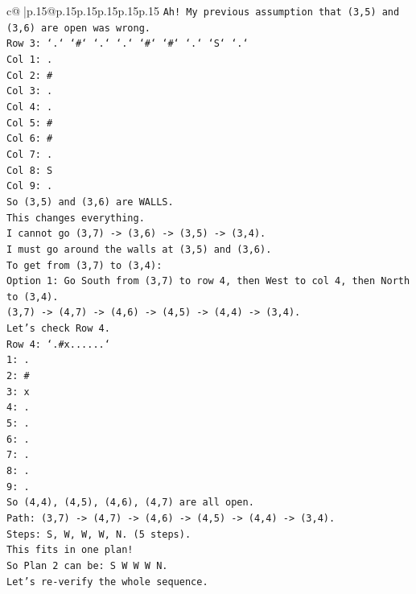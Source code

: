 \documentclass{article}
\begin{document}
{\begin{supertabular}{c@{$\;$}|p{.15\linewidth}@{}p{.15\linewidth}p{.15\linewidth}p{.15\linewidth}p{.15\linewidth}p{.15\linewidth}}
{{{\texttt{Ah! My previous assumption that (3,5) and (3,6) are open was wrong.} \\
\texttt{Row 3: `.` `\#` `.` `.` `\#` `\#` `.` `S` `.`} \\
\texttt{Col 1: .} \\
\texttt{Col 2: \#} \\
\texttt{Col 3: .} \\
\texttt{Col 4: .} \\
\texttt{Col 5: \#} \\
\texttt{Col 6: \#} \\
\texttt{Col 7: .} \\
\texttt{Col 8: S} \\
\texttt{Col 9: .} \\
\texttt{So (3,5) and (3,6) are WALLS.} \\
\texttt{This changes everything.} \\
\texttt{I cannot go (3,7) {-}> (3,6) {-}> (3,5) {-}> (3,4).} \\
\texttt{I must go around the walls at (3,5) and (3,6).} \\
\texttt{To get from (3,7) to (3,4):} \\
\texttt{Option 1: Go South from (3,7) to row 4, then West to col 4, then North to (3,4).} \\
\texttt{(3,7) {-}> (4,7) {-}> (4,6) {-}> (4,5) {-}> (4,4) {-}> (3,4).} \\
\texttt{Let's check Row 4.} \\
\texttt{Row 4: `.\#x......`} \\
\texttt{1: .} \\
\texttt{2: \#} \\
\texttt{3: x} \\
\texttt{4: .} \\
\texttt{5: .} \\
\texttt{6: .} \\
\texttt{7: .} \\
\texttt{8: .} \\
\texttt{9: .} \\
\texttt{So (4,4), (4,5), (4,6), (4,7) are all open.} \\
\texttt{Path: (3,7) {-}> (4,7) {-}> (4,6) {-}> (4,5) {-}> (4,4) {-}> (3,4).} \\
\texttt{Steps: S, W, W, W, N. (5 steps).} \\
\texttt{This fits in one plan!} \\
\texttt{So Plan 2 can be: S W W W N.} \\
\texttt{Let's re{-}verify the whole sequence.} \\
}}}
\end{supertabular}}
\end{document}
